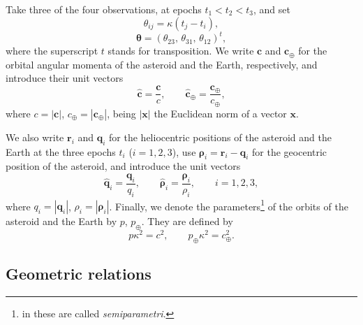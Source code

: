 \documentclass[11pt]{article}
\def\angmom{\bm{c}}
\def\bq{\bm{q}}
\def\qhat{\hat{\bm{q}}}
\def\rhohat{{\hat{\bm{\rho}}}}
\def\br{\bm{r}}
\def\rhovec{{\bm{\rho}}}
\def\angmom{{\bm{c}}}
\begin{document}
Take three of the four observations, at epochs $t_1<t_2<t_3$, and set
\begin{equation*}
    \theta_{ij} = \kappa (t_j - t_i),
\end{equation*}
\begin{equation*}
    \bm{\theta} = (\theta_{23},\,\theta_{31},\,\theta_{12})^t,
\end{equation*}
where the superscript $t$ stands for transposition.
We write $\angmom$ and $\angmom_\oplus$ for the orbital angular momenta of the asteroid and the Earth, respectively, and introduce their unit vectors
\begin{equation*}
    \hat{\angmom} = \frac{\angmom}{c}, \qquad
    \hat{\angmom}_\oplus = \frac{\angmom_\oplus}{c_\oplus},
\end{equation*}
where $c=|\angmom|$, $c_\oplus=|\angmom_\oplus|$, being $|\bm{x}|$ the Euclidean norm of a vector $\bm{x}$.

We also write $\br_i$ and $\bq_i$ for the heliocentric positions of the asteroid and the Earth at the three epochs $t_i$ ($i=1,2,3$), use $\rhovec_i = \br_i - \bq_i$ for the geocentric position of the asteroid, and introduce the unit vectors
\begin{equation*}
    \qhat_i = \frac{\bq_i}{q_i},\qquad \rhohat_i = \frac{\rhovec_i}{\rho_i},\qquad i=1,2,3,
\end{equation*}
where $q_i=|\bq_i|$, $\rho_i=|\rhovec_i|$. 
Finally, we denote the parameters\footnote{in \cite{mossotti} these are called {\em semiparametri}.} of the orbits of the asteroid and the Earth by $p$, $p_\oplus$.
They are defined by
\begin{equation*}
    p\kappa^2 = c^2,\qquad p_\oplus\kappa^2 = c_\oplus^2.
\end{equation*}


\subsection{Geometric relations}
\end{document}
